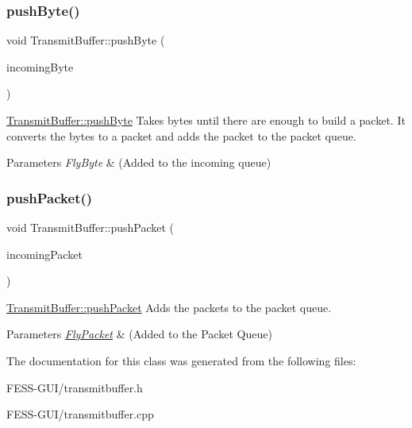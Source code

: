 \subsubsection{\texorpdfstring{push\+Byte()}{pushByte()}}
{\footnotesize\ttfamily void Transmit\+Buffer\+::push\+Byte (\begin{DoxyParamCaption}\item[{Fly\+Byte}]{incoming\+Byte }\end{DoxyParamCaption})}



\hyperlink{class_transmit_buffer_aa7966064a6abaeb5ff3f7c8ff0402ec3}{Transmit\+Buffer\+::push\+Byte} Takes bytes until there are enough to build a packet. It converts the bytes to a packet and adds the packet to the packet queue. 


\begin{DoxyParams}{Parameters}
{\em Fly\+Byte} & (Added to the incoming queue) \\
\hline
\end{DoxyParams}
\hypertarget{class_transmit_buffer_a002757b58f4227167db20c8977bbdb28}{}\label{class_transmit_buffer_a002757b58f4227167db20c8977bbdb28} 
\subsubsection{\texorpdfstring{push\+Packet()}{pushPacket()}}
{\footnotesize\ttfamily void Transmit\+Buffer\+::push\+Packet (\begin{DoxyParamCaption}\item[{\hyperlink{class_fly_packet}{Fly\+Packet}}]{incoming\+Packet }\end{DoxyParamCaption})}



\hyperlink{class_transmit_buffer_a002757b58f4227167db20c8977bbdb28}{Transmit\+Buffer\+::push\+Packet} Adds the packets to the packet queue. 


\begin{DoxyParams}{Parameters}
{\em \hyperlink{class_fly_packet}{Fly\+Packet}} & (Added to the Packet Queue) \\
\hline
\end{DoxyParams}


The documentation for this class was generated from the following files\+:\begin{DoxyCompactItemize}
\item 
F\+E\+S\+S-\/\+G\+U\+I/transmitbuffer.\+h\item 
F\+E\+S\+S-\/\+G\+U\+I/transmitbuffer.\+cpp\end{DoxyCompactItemize}
